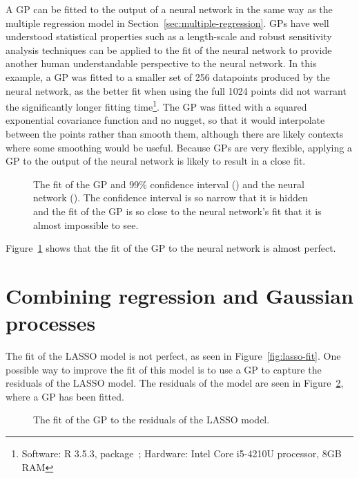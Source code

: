 A \ac{GP} can be fitted to the output of a neural network in the same way as the multiple regression model in Section~\ref{sec:multiple-regression}.
\acp{GP} have well understood statistical properties such as a length-scale and robust sensitivity analysis techniques can be applied to the fit of the neural network to provide another human understandable perspective to the neural network.
In this example, a \ac{GP} was fitted to a smaller set of 256 datapoints produced by the neural network, as the better fit when using the full 1024 points did not warrant the significantly longer fitting time\footnote{Software: R 3.5.3,  package~\autocite{dancik2008}; Hardware: Intel Core i5-4210U processor, 8GB RAM}.
The \ac{GP} was fitted with a squared exponential covariance function and no nugget, so that it would interpolate between the points rather than smooth them, although there are likely contexts where some smoothing would be useful.
Because \acp{GP} are very flexible, applying a \ac{GP} to the output of the neural network is likely to result in a close fit.

\begin{figure}[htbp]
	\centering
	
	\caption{The fit of the \ac{GP} and 99\% confidence interval (\gpcolour) and the neural network (\nncolour). The confidence interval is so narrow that it is hidden and the fit of the \ac{GP} is so close to the neural network's fit that it is almost impossible to see.}
	\label{fig:gp-fit}
\end{figure}

Figure~\ref{fig:gp-fit} shows that the fit of the \ac{GP} to the neural network is almost perfect.

\section{Combining regression and Gaussian processes}

The fit of the \ac{LASSO} model is not perfect, as seen in Figure~\ref{fig:lasso-fit}.
One possible way to improve the fit of this model is to use a \ac{GP} to capture the residuals of the \ac{LASSO} model.
The residuals of the model are seen in Figure~\ref{fig:gp-resids-fit}, where a \ac{GP} has been fitted.

\begin{figure}[htbp]
	\centering
	
	\caption{The fit of the \ac{GP} to the residuals of the \ac{LASSO} model.}
	\label{fig:gp-resids-fit}
\end{figure}

